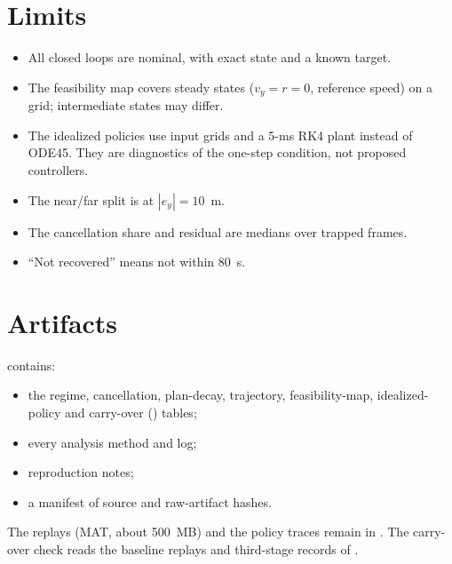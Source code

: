\documentclass[11pt]{article}
\begin{document}
\section{Limits}
\begin{itemize}
\item All closed loops are nominal, with exact state and a known target.
\item The feasibility map covers steady states ($v_y=r=0$, reference speed) on a
grid; intermediate states may differ.
\item The idealized policies use input grids and a 5-ms RK4 plant instead of
ODE45. They are diagnostics of the one-step condition, not proposed
controllers.
\item The near/far split is at $|e_y|=10$~m.
\item The cancellation share and residual are medians over trapped frames.
\item ``Not recovered'' means not within 80~s.
\end{itemize}

\section{Artifacts}
 contains:
\begin{itemize}
\item the regime, cancellation, plan-decay, trajectory, feasibility-map,
idealized-policy and carry-over () tables;
\item every analysis method and log;
\item reproduction notes;
\item a manifest of source and raw-artifact hashes.
\end{itemize}
The replays (MAT, about 500~MB) and the policy traces remain in
. The
carry-over check reads the baseline replays and third-stage records of
.
\end{document}
